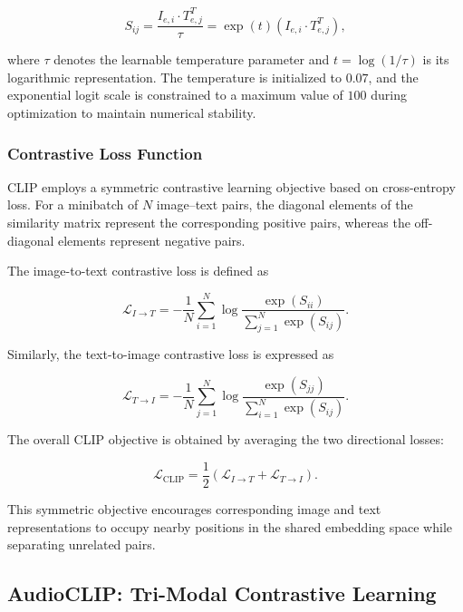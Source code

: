 \documentclass[pdflatex,sn-mathphys-num]{sn-jnl}%
\theoremstyle{thmstyleone}%
\theoremstyle{thmstyletwo}%
\theoremstyle{thmstylethree}%
\begin{document}
\begin{equation}
S_{ij} = \frac{I_{e,i} \cdot T_{e,j}^{T}}{\tau}
= \exp(t)(I_{e,i} \cdot T_{e,j}^{T}),
\label{eq:clip_similarity}
\end{equation}

where $\tau$ denotes the learnable temperature parameter and $t=\log(1/\tau)$ is its logarithmic representation. The temperature is initialized to $0.07$, and the exponential logit scale is constrained to a maximum value of $100$ during optimization to maintain numerical stability.

\subsubsection{Contrastive Loss Function}

CLIP employs a symmetric contrastive learning objective based on cross-entropy loss. For a minibatch of $N$ image--text pairs, the diagonal elements of the similarity matrix represent the corresponding positive pairs, whereas the off-diagonal elements represent negative pairs.

The image-to-text contrastive loss is defined as

\begin{equation}
\mathcal{L}_{I \rightarrow T}
=
-\frac{1}{N}
\sum_{i=1}^{N}
\log
\frac{\exp(S_{ii})}
{\sum_{j=1}^{N}\exp(S_{ij})}.
\label{eq:clip_i2t}
\end{equation}

Similarly, the text-to-image contrastive loss is expressed as

\begin{equation}
\mathcal{L}_{T \rightarrow I}
=
-\frac{1}{N}
\sum_{j=1}^{N}
\log
\frac{\exp(S_{jj})}
{\sum_{i=1}^{N}\exp(S_{ij})}.
\label{eq:clip_t2i}
\end{equation}

The overall CLIP objective is obtained by averaging the two directional losses:

\begin{equation}
\mathcal{L}_{\mathrm{CLIP}}
=
\frac{1}{2}
\left(
\mathcal{L}_{I \rightarrow T}
+
\mathcal{L}_{T \rightarrow I}
\right).
\label{eq:clip_total}
\end{equation}

This symmetric objective encourages corresponding image and text representations to occupy nearby positions in the shared embedding space while separating unrelated pairs.

\subsection{AudioCLIP: Tri-Modal Contrastive Learning}
\end{document}
